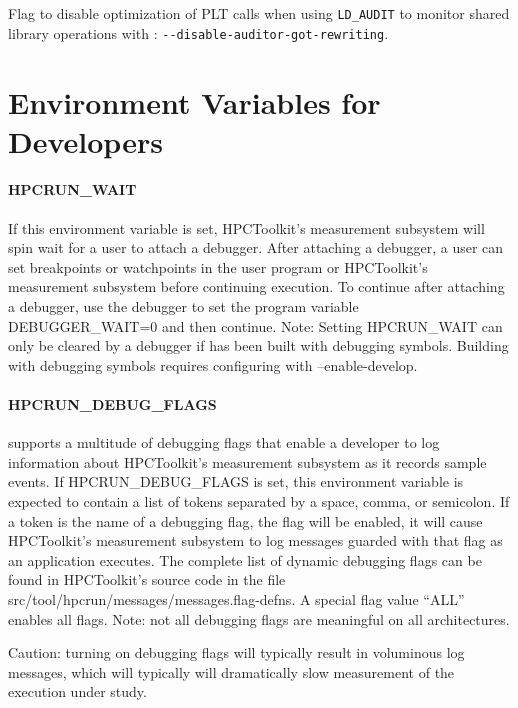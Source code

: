 \parg
Flag to disable optimization of PLT calls when using \verb|LD_AUDIT|  to monitor shared library operations with \hpcrun: \verb|--disable-auditor-got-rewriting|.

\section{Environment Variables for Developers}
\label{system-env}

\paragraph{HPCRUN\_WAIT}

If this environment variable is set, HPCToolkit's measurement subsystem
will spin wait for a user to attach a debugger. After attaching a
debugger, a user can set breakpoints or watchpoints in the user
program or HPCToolkit's measurement subsystem before continuing
execution. To continue after attaching a debugger, use the debugger
to set the program variable DEBUGGER\_WAIT=0 and then continue.
Note: Setting HPCRUN\_WAIT can only be cleared by a debugger
if \HPCToolkit{} has been built with debugging symbols.
Building \HPCToolkit{} with debugging symbols requires
configuring \HPCToolkit{} with --enable-develop.

\paragraph{HPCRUN\_DEBUG\_FLAGS}

\HPCToolkit{} supports a multitude of debugging flags that enable a
developer to log information about HPCToolkit's measurement subsystem
as it records sample events. If HPCRUN\_DEBUG\_FLAGS is set, this
environment variable is expected to contain a list of tokens separated
by a space, comma, or semicolon. If a token is the name of a debugging
flag, the flag will be enabled, it will cause HPCToolkit's measurement
subsystem to log messages guarded with that flag as an application
executes. The complete list of dynamic debugging flags can be found
in HPCToolkit's source code in the file
src/tool/hpcrun/messages/messages.flag-defns. A special flag value ``ALL'' enables all flags.
\parg
Note: not all debugging flags are
meaningful on all architectures.

\parg
Caution: turning on debugging flags
will typically result in voluminous log messages, which will typically will
dramatically slow measurement of the execution under study.

